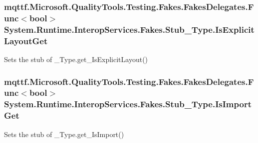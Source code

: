 \hypertarget{class_system_1_1_runtime_1_1_interop_services_1_1_fakes_1_1_stub___type_acc3cfb45433a532fb8796dbefe829f25}{
\subsubsection[{Is\-Explicit\-Layout\-Get}]{\setlength{\rightskip}{0pt plus 5cm}mqttf.\-Microsoft.\-Quality\-Tools.\-Testing.\-Fakes.\-Fakes\-Delegates.\-Func$<$bool$>$ System.\-Runtime.\-Interop\-Services.\-Fakes.\-Stub\-\_\-\-Type.\-Is\-Explicit\-Layout\-Get}}\label{class_system_1_1_runtime_1_1_interop_services_1_1_fakes_1_1_stub___type_acc3cfb45433a532fb8796dbefe829f25}


Sets the stub of \-\_\-\-Type.\-get\-\_\-\-Is\-Explicit\-Layout()

\hypertarget{class_system_1_1_runtime_1_1_interop_services_1_1_fakes_1_1_stub___type_acc84a50c59ab563ffbd0021fc17fc85d}{
\subsubsection[{Is\-Import\-Get}]{\setlength{\rightskip}{0pt plus 5cm}mqttf.\-Microsoft.\-Quality\-Tools.\-Testing.\-Fakes.\-Fakes\-Delegates.\-Func$<$bool$>$ System.\-Runtime.\-Interop\-Services.\-Fakes.\-Stub\-\_\-\-Type.\-Is\-Import\-Get}}\label{class_system_1_1_runtime_1_1_interop_services_1_1_fakes_1_1_stub___type_acc84a50c59ab563ffbd0021fc17fc85d}


Sets the stub of \-\_\-\-Type.\-get\-\_\-\-Is\-Import()

